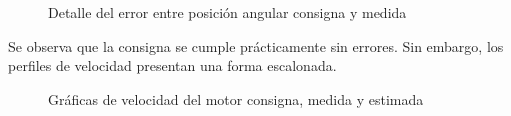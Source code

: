 \documentclass[a4paper, 10pt, onecolumn,journal]{ieeeconf}
\begin{document}
\begin{figure}[H]
	\centering
	\begin{adjustbox}{max width=\columnwidth}
	\end{adjustbox}
	\caption{Detalle del error entre posición angular consigna y medida}
	\label{Detalle del error entre posición angular consigna y medida }
\end{figure}
Se observa que la consigna se cumple prácticamente sin errores. Sin embargo, los perfiles de velocidad presentan una forma escalonada.
\begin{figure}[H]
	\centering
	\begin{adjustbox}{max width=\columnwidth}
	\end{adjustbox}
	\caption{Gráficas de velocidad del motor consigna, medida y estimada}
	\label{Gráficas de velocidad del motor consigna, medida y estimada}
\end{figure}
\end{document}
